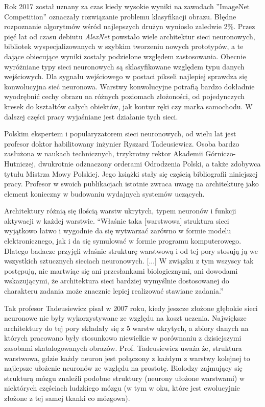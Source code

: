 \documentclass[12pt,a4paper,twoside,titlepage,openright]{book}
\begin{document}
Rok 2017 został uznany za czas kiedy wysokie wyniki na zawodach ''ImageNet Competition'' oznaczały rozwiązanie problemu klasyfikacji obrazu. Błędne rozpoznanie algorytmów wśród najlepszych drużyn wyniosło zaledwie 2\%. Przez pięć lat od czasu debiutu \textit{AlexNet} powstało wiele architektur sieci neuronowych, bibliotek wyspecjalizowanych w szybkim tworzeniu nowych prototypów, a te dające obiecujące wyniki zostały podzielone względem zastosowania. Obecnie wyróżniane typy sieci neuronowych są sklasyfikowane względem typu danych wejściowych. Dla sygnału wejściowego w postaci pikseli najlepiej sprawdza się konwolucyjna sieć neuronowa. Warstwy konwolucyjne potrafią bardzo dokładnie wyodrębnić cechy obrazu na różnych poziomach złożoności, od pojedynczych kresek do kształtów całych obiektów, jak kontur ręki czy marka samochodu. W dalszej części pracy wyjaśniane jest działanie tych sieci.

Polskim ekspertem i popularyzatorem sieci neuronowych, od wielu lat jest profesor doktor habilitowany inżynier Ryszard Tadeusiewicz. Osoba bardzo zasłużona w naukach technicznych, trzykrotny rektor Akademii Górniczo-Hutniczej, dwukrotnie odznaczony orderami Odrodzenia Polski, a także zdobywca tytułu Mistrza Mowy Polskiej. Jego książki stały się częścią bibliografii niniejszej pracy. Profesor w swoich publikacjach istotnie zwraca uwagę na architekturę jako element konieczny w budowaniu wydajnych systemów uczących.

Architektury różnią się ilością warstw ukrytych, typem neuronów i funkcji aktywacji w każdej warstwie.
“Właśnie taka [warstwowa] struktura sieci wyjątkowo łatwo i wygodnie da się wytwarzać zarówno w formie modelu elektronicznego, jak i da się symulować w formie programu komputerowego. Dlatego badacze przyjęli właśnie strukturę warstwową i od tej pory stosują ją we wszystkich sztucznych sieciach neuronowych. [...] W związku z tym wszyscy tak postępują, nie martwiąc się ani przesłankami biologicznymi, ani dowodami wskazującymi, że architektura sieci bardziej wymyślnie dostosowanej do charakteru zadania może znacznie lepiej realizować stawiane zadania.”

Tak profesor Tadeusiewicz pisał w 2007 roku, kiedy jeszcze złożone głębokie sieci neuronowe nie były wykorzystywane ze względu na koszt uczenia. Największe architektury do tej pory składały się z 5 warstw ukrytych, a zbiory danych na których pracowano były stosunkowo niewielkie w porównaniu z dzisiejszymi zasobami skatalogowanych obrazów. Prof. Tadeusiewicz uważa że, struktura warstwowa, gdzie każdy neuron jest połączony z każdym z warstwy kolejnej to najlepsze ułożenie neuronów ze względu na prostotę. Biolodzy zajmujący się strukturą mózgu znaleźli podobne struktury (neurony ułożone warstwami) w niektórych częściach ludzkiego mózgu (w tym w oku, które jest ewolucyjnie złożone z tej samej tkanki co mózgowa).
\end{document}
